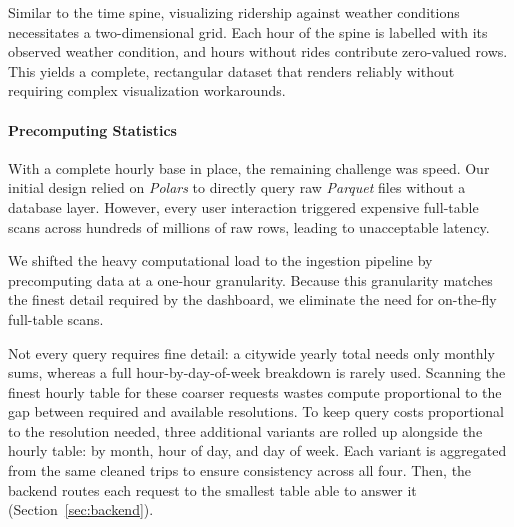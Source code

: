 Similar to the time spine, visualizing ridership against weather conditions necessitates a two-dimensional grid.
Each hour of the spine is labelled with its observed weather condition, and hours without rides contribute zero-valued rows.
This yields a complete, rectangular dataset that renders reliably without requiring complex visualization workarounds.

\paragraph{Precomputing Statistics}
With a complete hourly base in place, the remaining challenge was speed.
Our initial design relied on \emph{Polars} to directly query raw \emph{Parquet} files without a database layer.
However, every user interaction triggered expensive full-table scans across hundreds of millions of raw rows, leading to unacceptable latency.

We shifted the heavy computational load to the ingestion pipeline by precomputing data at a one-hour granularity.
Because this granularity matches the finest detail required by the dashboard, we eliminate the need for on-the-fly full-table scans.

Not every query requires fine detail: a citywide yearly total needs only monthly sums, whereas a full hour-by-day-of-week breakdown is rarely used.
Scanning the finest hourly table for these coarser requests wastes compute proportional to the gap between required and available resolutions.
To keep query costs proportional to the resolution needed, three additional variants are rolled up alongside the hourly table: by month, hour of day, and day of week. 
Each variant is aggregated from the same cleaned trips to ensure consistency across all four.
Then, the backend routes each request to the smallest table able to answer it (Section~\ref{sec:backend}).